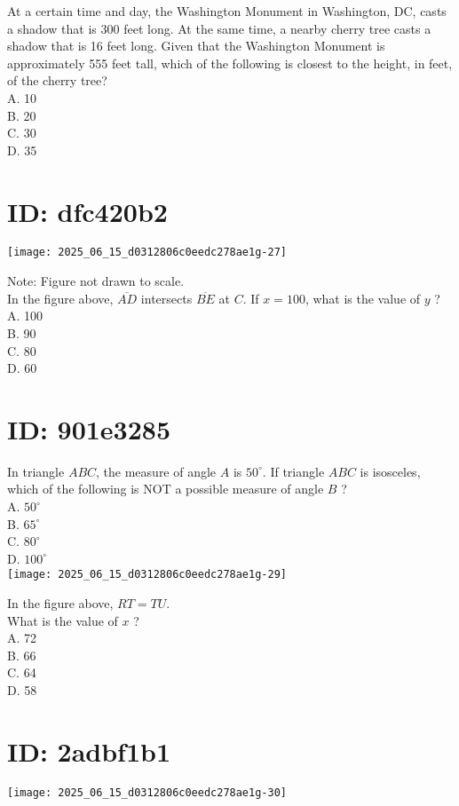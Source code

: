 At a certain time and day, the Washington Monument in Washington, DC, casts a shadow that is 300 feet long. At the same time, a nearby cherry tree casts a shadow that is 16 feet long. Given that the Washington Monument is approximately 555 feet tall, which of the following is closest to the height, in feet, of the cherry tree?\\
A. 10\\
B. 20\\
C. 30\\
D. 35

\section*{ID: dfc420b2}
\begin{center}
\texttt{[image: 2025\_06\_15\_d0312806c0eedc278ae1g-27]}
\end{center}

Note: Figure not drawn to scale.\\
In the figure above, $\overline{A D}$ intersects $\overline{B E}$ at $C$. If $x=100$, what is the value of $y$ ?\\
A. 100\\
B. 90\\
C. 80\\
D. 60

\section*{ID: 901e3285}
In triangle $A B C$, the measure of angle $A$ is $50^{\circ}$. If triangle $A B C$ is isosceles, which of the following is NOT a possible measure of angle $B$ ?\\
A. $50^{\circ}$\\
B. $65^{\circ}$\\
C. $80^{\circ}$\\
D. $100^{\circ}$\\
\texttt{[image: 2025\_06\_15\_d0312806c0eedc278ae1g-29]}

In the figure above, $R T=T U$.\\
What is the value of $x$ ?\\
A. 72\\
B. 66\\
C. 64\\
D. 58

\section*{ID: 2adbf1b1}
\begin{center}
\texttt{[image: 2025\_06\_15\_d0312806c0eedc278ae1g-30]}
\end{center}

